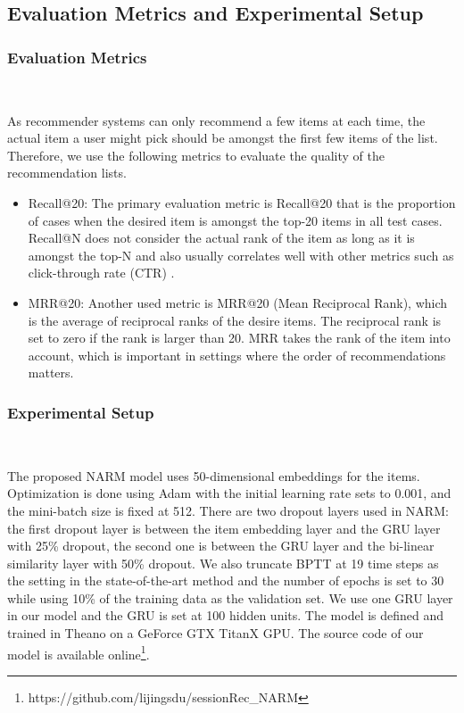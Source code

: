 \documentclass[sigconf]{acmart}
\begin{document}
\subsection{Evaluation Metrics and Experimental Setup}
  
\subsubsection{Evaluation Metrics}\
  
As recommender systems can only recommend a few items at each time, the actual item a user might pick should be amongst the first few items of the list. Therefore, we use the following metrics to evaluate the quality of the recommendation lists.

    \begin{itemize}
	    \item Recall@20: The primary evaluation metric is Recall@20 that is the proportion of cases when the desired item is amongst the top-20 items in all test cases. Recall@N does not consider the actual rank of the item as long as it is amongst the top-N and also usually correlates well with other metrics such as click-through rate (CTR) \cite{liu2012enlister}.
	    \item MRR@20: Another used metric is MRR@20 (Mean Reciprocal Rank), which is the average of reciprocal ranks of the desire items. The reciprocal rank is set to zero if the rank is larger than 20. MRR takes the rank of the item into account, which is important in settings where the order of recommendations matters.
    \end{itemize}
  
\subsubsection{Experimental Setup}\
  
The proposed NARM model uses 50-dimensional embeddings for the items. Optimization is done using Adam \cite{kingma2014adam} with the initial learning rate sets to 0.001, and the mini-batch size is fixed at 512. There are two dropout layers used in NARM: the first dropout layer is between the item embedding layer and the GRU layer with 25\% dropout, the second one is between the GRU layer and the bi-linear similarity layer with 50\% dropout. We also truncate BPTT at 19 time steps as the setting in the state-of-the-art method \cite{tan2016improved} and the number of epochs is set to 30 while using 10\% of the training data as the validation set. We use one GRU layer in our model and the GRU is set at 100 hidden units. The model is defined and trained in Theano on a GeForce GTX TitanX GPU. The source code of our model is available online\footnote{https://github.com/lijingsdu/sessionRec\_NARM}.
\end{document}
